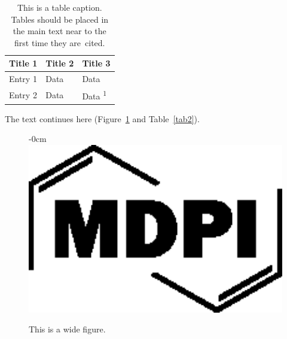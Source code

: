 \documentclass[entropy,article,submit,pdftex,moreauthors]{Definitions/mdpi}
\begin{document}
\begin{table}[H] 
\caption{This is a table caption. Tables should be placed in the main text near to the first time they are~cited.\label{tab1}}
\begin{tabularx}{\textwidth}{CCC}
\toprule
\textbf{Title 1}	& \textbf{Title 2}	& \textbf{Title 3}\\
\midrule
Entry 1		& Data			& Data\\
Entry 2		& Data			& Data \textsuperscript{1}\\
\bottomrule
\end{tabularx}
\end{table}

The text continues here (Figure~\ref{fig2} and Table~\ref{tab2}).

\begin{figure}[H]
\begin{adjustwidth}{-\extralength}{0cm}
\centering
\includegraphics[width=15.5cm]{Definitions/logo-mdpi}
\end{adjustwidth}
\caption{This is a wide figure.\label{fig2}}
\end{figure}  
\end{document}
